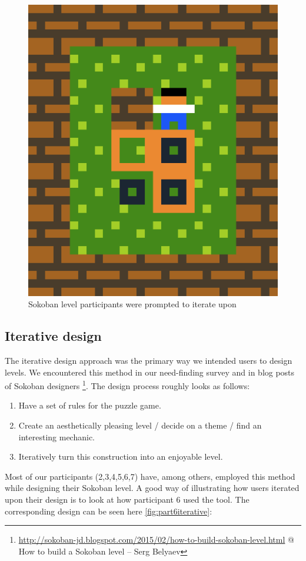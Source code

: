\begin{figure}
\centering
\includegraphics[width=0.5\linewidth]{figures/sokobaniteratelevel.png}
\caption[SokobanIterate]{Sokoban level participants were prompted to iterate upon\label{fig:sokobaniterate}}
\end{figure}


\subsection{Iterative design}

The iterative design approach was the primary way we intended users to design levels. We encountered this method in our need-finding survey and in blog posts of Sokoban designers \footnote{\url{http://sokoban-jd.blogspot.com/2015/02/how-to-build-sokoban-level.html} @ How to build a Sokoban level -- Serg Belyaev}. The design process roughly looks as follows:

\begin{enumerate}
\item Have a set of rules for the puzzle game.
\item Create an aesthetically pleasing level / decide on a
theme / find an interesting mechanic.
\item Iteratively turn this construction into an enjoyable level.
\end{enumerate}

Most of our participants (2,3,4,5,6,7) have, among others, employed this method while designing their Sokoban level.
A good way of illustrating how users iterated upon their design is to look at how participant 6 used the tool. The corresponding design can be seen here \ref{fig:part6iterative}:


